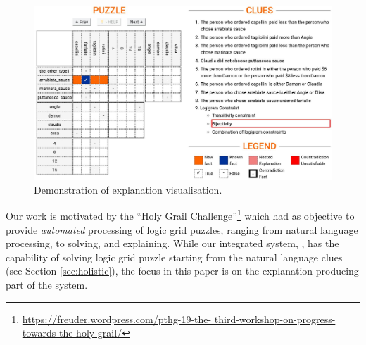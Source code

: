 \begin{figure}[ht]
\centering
\includegraphics[width=0.7\linewidth]{figures/introduction.jpeg}
\caption{Demonstration of explanation visualisation.}
\label{fig:zebrascreen}
\end{figure}

Our work is motivated by the ``Holy Grail Challenge''\footnote{\url{https://freuder.wordpress.com/pthg-19-the- third-workshop-on-progress-towards-the-holy-grail/}} which had as objective to provide \textit{automated} processing of logic grid puzzles, ranging from natural language processing, to solving, and explaining.
While our integrated system, \ourtool, has the capability of solving logic grid puzzle starting from the natural language clues (see Section \ref{sec:holistic}), the focus in this paper is on the explanation-producing part of the system.


